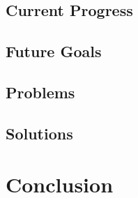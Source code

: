 \documentclass[onecolumn, draftclsnofoot,10pt, compsoc]{IEEEtran}
\begin{document}
\subsection{Current Progress}

\subsection{Future Goals}

\subsection{Problems}

\subsection{Solutions}








\section{Conclusion}






\end{document}
